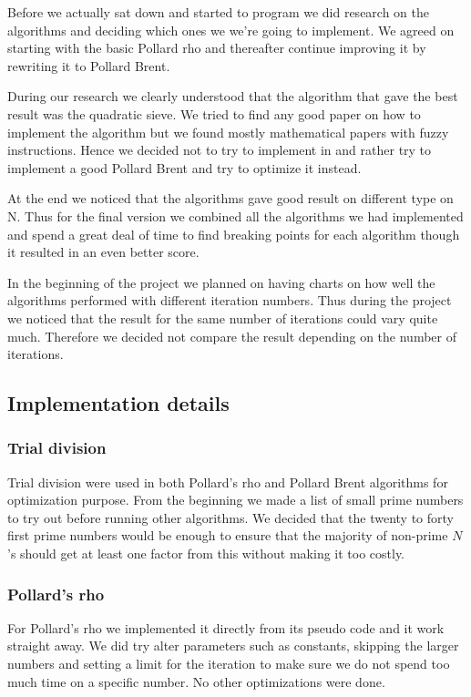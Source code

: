 Before we actually sat down and started to program we did research on the algorithms and deciding which ones we we're going to implement. We agreed on starting with the basic Pollard rho and thereafter continue improving it by rewriting it to Pollard Brent.

During our research we clearly understood that the algorithm that gave the best result was the quadratic sieve. We tried to find any good paper on how to implement the algorithm but we found mostly mathematical papers with fuzzy instructions. Hence we decided not to try to implement in and rather try to implement a good Pollard Brent and try to optimize it instead.

At the end we noticed that the algorithms gave good result on different type on N. Thus for the final version we combined all the algorithms we had implemented and spend a great deal of time to find breaking points for each algorithm though it resulted in an even better score.

In the beginning of the project we planned on having charts on how well the algorithms performed with different iteration numbers. Thus during the project we noticed that the result for the same number of iterations could vary quite much. Therefore we decided not compare the result depending on the number of iterations.

\subsection{Implementation details}

\subsubsection{Trial division}

Trial division were used in both Pollard's rho and Pollard Brent algorithms for optimization purpose. From the beginning we made a list of small prime numbers to try out before running other algorithms. We decided that the twenty to forty first prime numbers would be enough to ensure that the majority of non-prime $N$'s should get at least one factor from this without making it too costly.

\subsubsection{Pollard's rho}

For Pollard's rho we implemented it directly from its pseudo code and it work straight away. We did try alter parameters such as constants, skipping the larger numbers and setting a limit for the iteration to make sure we do not spend too much time on a specific number. No other optimizations were done. 

